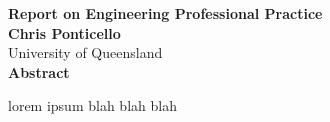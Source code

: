 \begin{center}
	{\Large \bf Report on Engineering Professional Practice} \\
	\vspace{0.4cm}
	{\Large \bf Chris Ponticello} \\
	\vspace{0.4cm}
	{\Large University of Queensland} \\
	\vspace{2.0cm}
	{\Large \bf Abstract} \\
\end{center}




lorem ipsum blah blah blah
